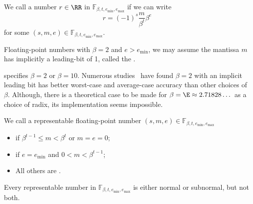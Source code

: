 \begin{defn}
  We call a number $r\in\RR$  in
  $\mathbb{F}_{\beta,t,e_{\text{min}},e_{\text{max}}}$ if we can write
  \begin{equation}
    r = (-1)^{s}\frac{m}{\beta^{t}}\beta^{e}
  \end{equation}
  for some $(s,m,e)\in\mathbb{F}_{\beta,t,e_{\text{min}},e_{\text{max}}}$.
\end{defn}
\begin{defn}
  Floating-point numbers with $\beta=2$ and $e>e_{\text{min}}$, we may
  assume the mantissa $m$ has implicitly a leading-bit of 1,
  called the .
\end{defn}
\begin{rmk}
   specifies $\beta=2$ or $\beta=10$. Numerous studies~\cite{DBLP:journals/corr/abs-1004-3374,10.1145/363235.363240,5009112,10.1145/362003.362013,4039164}
have found $\beta=2$ with an implicit leading bit has better worst-case
and average-case accuracy than other choices of $\beta$. Although, there
is a theoretical case to be made for $\beta=\E\approx2.71828\dots$ as a
choice of radix, its implementation seems impossible.
\end{rmk}
\begin{defn}\label{def:computer-float:normal-subnormal-denormal}
We call a representable floating-point number $(s,m,e)\in\mathbb{F}_{\beta,t,e_{\text{min}},e_{\text{max}}}$
\begin{itemize}
\item{} if $\beta^{t-1}\leq m<\beta^{t}$ or $m=e=0$;
\item{} if $e=e_{\text{min}}$ and $0<m<\beta^{t-1}$;
\item All others are .
\end{itemize}
\end{defn}
\begin{thm}
  Every representable number in $\mathbb{F}_{\beta,t,e_{\text{min}},e_{\text{max}}}$
  is either normal or subnormal, but not both.
\end{thm}
